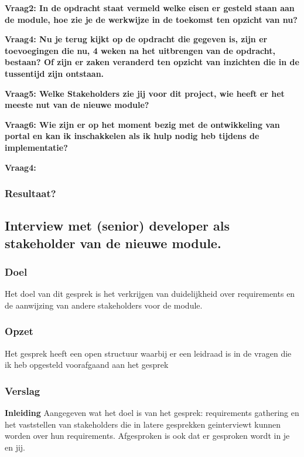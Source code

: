 \textbf{Vraag2: In de opdracht staat vermeld welke eisen er gesteld staan aan de module, hoe zie je de werkwijze in de toekomst ten opzicht van nu?}

\lipsum[03]
\bigskip

\textbf{Vraag4: Nu je terug kijkt op de opdracht die gegeven is, zijn er toevoegingen die nu, 4 weken na het uitbrengen van de opdracht, bestaan? Of zijn er zaken veranderd ten opzicht van inzichten die in de tussentijd zijn ontstaan.}

\lipsum[05]
\bigskip

\textbf{Vraag5: Welke Stakeholders zie jij voor dit project, wie heeft er het meeste nut van de nieuwe module? }

\lipsum[06]
\bigskip

\textbf{Vraag6: Wie zijn er op het moment bezig met de ontwikkeling van portal en kan ik inschakkelen als ik hulp nodig heb tijdens de implementatie?}

\lipsum[09]
\bigskip

\textbf{Vraag4: }

\lipsum[07]

\subsubsection{Resultaat?}
\subsection{Interview met (senior) developer als stakeholder van de nieuwe module.}

\subsubsection{Doel}
Het doel van dit gesprek is het verkrijgen van duidelijkheid over requirements en de aanwijzing van andere stakeholders voor de module.

\subsubsection{Opzet}
Het gesprek heeft een open structuur waarbij er een leidraad is in de vragen die ik heb opgesteld voorafgaand aan het gesprek

\subsubsection{Verslag}
\textbf{Inleiding}
Aangegeven wat het doel is van het gesprek: requirements gathering en het vaststellen van stakeholders die in latere gesprekken geinterviewt kunnen worden over hun requirements. Afgesproken is ook dat er gesproken wordt in je en jij.

